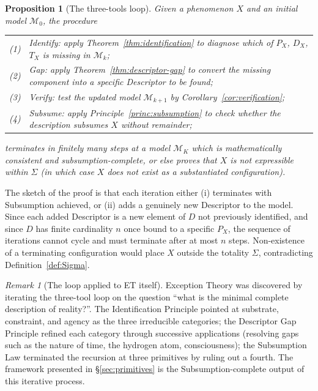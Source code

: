 \documentclass[11pt,a4paper]{article}
\newtheorem{proposition}[theorem]{Proposition}
\theoremstyle{definition}
\theoremstyle{remark}
\newtheorem{remark}[theorem]{Remark}
\begin{document}
\begin{proposition}[The three-tools loop]\label{prop:loop}
Given a phenomenon $X$ and an initial model $\mathcal{M}_{0}$, the procedure
\begin{center}
\begin{tabular}{rl}
(1) & Identify: apply Theorem~\ref{thm:identification} to diagnose which of $P_{X}$, $D_{X}$, $T_{X}$ is missing in $\mathcal{M}_{k}$;\\
(2) & Gap: apply Theorem~\ref{thm:descriptor-gap} to convert the missing component into a specific Descriptor to be found;\\
(3) & Verify: test the updated model $\mathcal{M}_{k+1}$ by Corollary~\ref{cor:verification};\\
(4) & Subsume: apply Principle~\ref{princ:subsumption} to check whether the description subsumes $X$ without remainder;
\end{tabular}
\end{center}
terminates in finitely many steps at a model $\mathcal{M}_{K}$ which is mathematically consistent and subsumption-complete, or else proves that $X$ is not expressible within $\Sigma$ (in which case $X$ does not exist as a substantiated configuration).
\end{proposition}

The sketch of the proof is that each iteration either (i) terminates with Subsumption achieved, or (ii) adds a genuinely new Descriptor to the model. Since each added Descriptor is a new element of $D$ not previously identified, and since $D$ has finite cardinality $n$ once bound to a specific $P_{X}$, the sequence of iterations cannot cycle and must terminate after at most $n$ steps. Non-existence of a terminating configuration would place $X$ outside the totality $\Sigma$, contradicting Definition~\ref{def:Sigma}.

\begin{remark}[The loop applied to ET itself]
Exception Theory was discovered by iterating the three-tool loop on the question ``what is the minimal complete description of reality?''. The Identification Principle pointed at substrate, constraint, and agency as the three irreducible categories; the Descriptor Gap Principle refined each category through successive applications (resolving gaps such as the nature of time, the hydrogen atom, consciousness); the Subsumption Law terminated the recursion at three primitives by ruling out a fourth. The framework presented in \S\ref{sec:primitives} is the Subsumption-complete output of this iterative process.
\end{remark}
\end{document}
